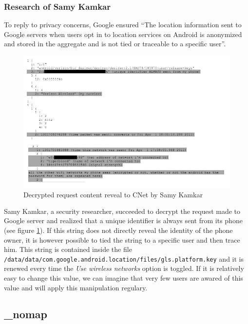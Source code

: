 \subsubsection{Research of Samy Kamkar}

To reply to privacy concerns, Google ensured ``The location information sent to Google servers when users opt in to location services on Android is anonymized and stored in the aggregate and is not tied or traceable to a specific user''\cite{loc-not-traceable}.\\

\begin{figure}[h]
  \hspace*{-1cm}
  \centering
  \includegraphics[width=15cm]{images/reqdecode.jpg}
  \caption{Decrypted request content reveal to CNet by Samy Kamkar}
  \label{fig:reqdecode}
\end{figure}

Samy Kamkar, a security researcher, succeeded to decrypt the request made to Google server and realized that a unique identifier is always sent from its phone (see figure \ref{fig:reqdecode}).\cite{cnet-andr-samy}
If this string does not directly reveal the identity of the phone owner, it is however possible to tied the string to a specific user and then trace him.
This string is contained inside the file \texttt{/data/data/com.google.android.location/files/gls.platform.key} and it is renewed every time the \emph{Use wireless networks} option is toggled.
If it is relatively easy to change this value, we can imagine that very few users are awared of this value and will apply this manipulation regulary.

\subsection{\_nomap}

